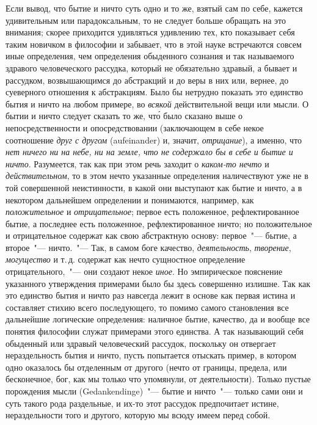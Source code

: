 Если вывод, что бытие и ничто суть одно и то же,
взятый сам по себе, кажется удивительным или парадоксальным,
то не следует больше обращать на это внимания;
скорее приходится удивляться удивлению тех, кто
показывает себя таким новичком в философии и забывает,
что в этой науке встречаются совсем иные определения,
чем определения обыденного сознания и так называемого
здравого человеческого рассудка, который не
обязательно здравый, а бывает и рассудком, возвышающимся
до абстракций и до веры в них или, вернее, до
суеверного отношения к абстракциям. Было бы нетрудно
показать это единство бытия и ничто на любом примере,
во \emph{всякой} действительной вещи или мысли. О бытии и
ничто следует сказать то же, чт\'о было сказано выше
о непосредственности и опосредствовании (заключающем
в себе некое соотношение \emph{друг с другом} (aufeinander)
и, значит, \emph{отрицание}), а именно, что \emph{нет ничего ни
на небе, ни на земле, что не содержало бы в себе и бытие
и ничто}. Разумеется, так как при этом речь заходит
о \emph{каком-то нечто} и \emph{действительном}, то в этом нечто указанные
определения наличествуют уже не в той совершенной
неистинности, в какой они выступают как бытие
и ничто, а в некотором дальнейшем определении и понимаются,
например, как \emph{положительное} и \emph{отрицательное};
первое есть положенное, рефлектированное бытие, а последнее
есть положенное, рефлектированное ничто; но
положительное и отрицательное содержат как свою абстрактную
основу: первое~"--- бытие, а второе~"--- ничто.~"---
Так, в самом боге качество, \emph{деятельность}, \emph{творение}, \emph{могущество}
и т.\,д. содержат как нечто сущностное определение
отрицательного,~"--- они создают некое \emph{иное}. Но эмпирическое
пояснение указанного утверждения примерами
было бы здесь совершенно излишне. Так как это
единство бытия и ничто раз навсегда лежит в основе как
первая истина и составляет стихию всего последующего,
то помимо самого становления все дальнейшие логические
определения: наличное бытие, качество, да и вообще
все понятия философии служат примерами этого единства.
А так называющий себя обыденный или здравый
человеческий рассудок, поскольку он отвергает нераздельность
бытия и ничто, пусть попытается отыскать
пример, в котором одно оказалось бы отделенным от
другого (нечто от границы, предела, или бесконечное,
бог, как мы только что упомянули, от деятельности).
Только пустые порождения мысли (Gedankendinge)~"---
бытие и ничто~"--- только сами они и суть такого рода
раздельные, и их-то этот рассудок предпочитает истине,
нераздельности того и другого, которую мы всюду имеем
перед собой.

